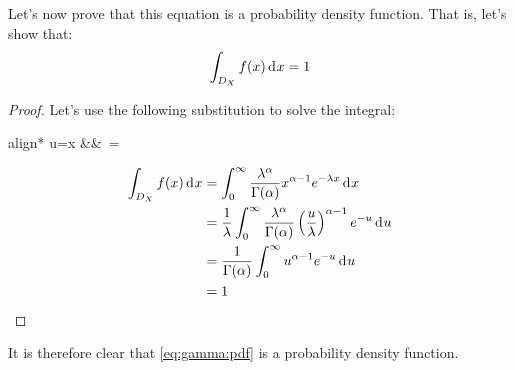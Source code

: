 \documentclass[12pt]{article}
\begin{document}
Let's now prove that this equation is a probability density function. That is, let's show that:
\begin{equation}
	\int_{D_X} f(x)\mathop{}\!\mathrm{d^{}}x = 1
\end{equation}
\begin{proof}
	Let's use the following substitution to solve the integral:
	\begin{empheq}[box=\widefbox]{align*}
		u=\lambda x	&&\,	=\lambda{}
	\end{empheq}
	\begin{equation}
		\begin{split}
			\int_{D_X} f(x)\mathop{}\!\mathrm{d^{}}x	&=	\int^\infty_0\frac{\lambda^\alpha}{\Gamma(\alpha)}x^{\alpha -1}e^{-\lambda x}\mathop{}\!\mathrm{d^{}}x\\
									&=	\frac{1}{\lambda}\int^\infty_0\frac{\lambda^\alpha}{\Gamma(\alpha)}\left(\frac{u}{\lambda}\right)^{\alpha-1}e^{-u}\mathop{}\!\mathrm{d^{}}u\\
									&=	\frac{1}{\Gamma(\alpha)}\int^\infty_0 u^{\alpha-1}e^{-u}\mathop{}\!\mathrm{d^{}}u\\
									&=	1
		\end{split}
	\end{equation}
\end{proof}
It is therefore clear that \autoref{eq:gamma:pdf} is a probability density function.
\end{document}
